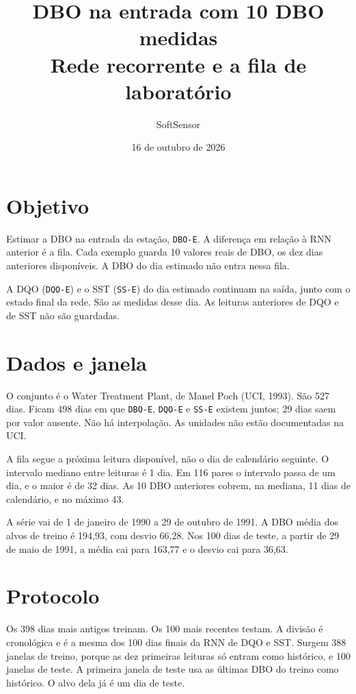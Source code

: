 \documentclass[11pt,a4paper]{article}
\title{DBO na entrada com 10 DBO medidas\\[0.3em]
\large Rede recorrente e a fila de laboratório}
\author{SoftSensor}
\date{16 de outubro de 2026}
\begin{document}
\maketitle

\section{Objetivo}

Estimar a DBO na entrada da estação, \texttt{DBO-E}. A diferença em relação à RNN anterior é a fila. Cada exemplo guarda 10 valores reais de DBO, os dez dias anteriores disponíveis. A DBO do dia estimado não entra nessa fila.

A DQO (\texttt{DQO-E}) e o SST (\texttt{SS-E}) do dia estimado continuam na saída, junto com o estado final da rede. São as medidas desse dia. As leituras anteriores de DQO e de SST não são guardadas.

\section{Dados e janela}

O conjunto é o Water Treatment Plant, de Manel Poch (UCI, 1993). São 527 dias. Ficam 498 dias em que \texttt{DBO-E}, \texttt{DQO-E} e \texttt{SS-E} existem juntos; 29 dias saem por valor ausente. Não há interpolação. As unidades não estão documentadas na UCI.

A fila segue a próxima leitura disponível, não o dia de calendário seguinte. O intervalo mediano entre leituras é 1 dia. Em 116 pares o intervalo passa de um dia, e o maior é de 32 dias. As 10 DBO anteriores cobrem, na mediana, 11 dias de calendário, e no máximo 43.

A série vai de 1 de janeiro de 1990 a 29 de outubro de 1991. A DBO média dos alvos de treino é 194,93, com desvio 66,28. Nos 100 dias de teste, a partir de 29 de maio de 1991, a média cai para 163,77 e o desvio cai para 36,63.

\section{Protocolo}

Os 398 dias mais antigos treinam. Os 100 mais recentes testam. A divisão é cronológica e é a mesma dos 100 dias finais da RNN de DQO e SST. Surgem 388 janelas de treino, porque as dez primeiras leituras só entram como histórico, e 100 janelas de teste. A primeira janela de teste usa as últimas DBO do treino como histórico. O alvo dela já é um dia de teste.
\end{document}
